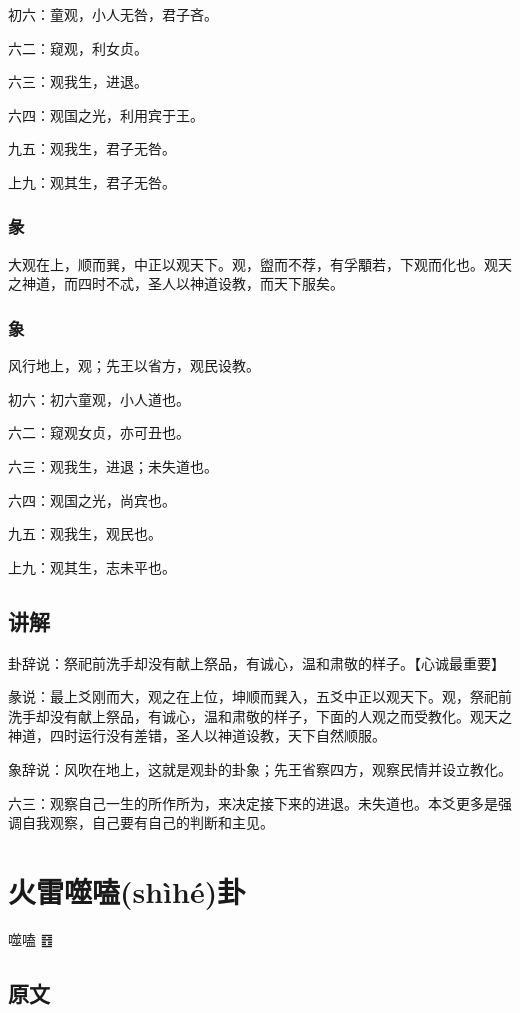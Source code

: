 \documentclass[12pt,oneside]{book}
\begin{document}
初六：童观，小人无咎，君子吝。

六二：窥观，利女贞。

六三：观我生，进退。

六四：观国之光，利用宾于王。

九五：观我生，君子无咎。

上九：观其生，君子无咎。

\subsection{彖}
大观在上，顺而巽，中正以观天下。观，盥而不荐，有孚顒若，下观而化也。观天之神道，而四时不忒，圣人以神道设教，而天下服矣。

\subsection{象}
风行地上，观；先王以省方，观民设教。

初六：初六童观，小人道也。

六二：窥观女贞，亦可丑也。

六三：观我生，进退；未失道也。

六四：观国之光，尚宾也。

九五：观我生，观民也。

上九：观其生，志未平也。

\section{讲解}
卦辞说：祭祀前洗手却没有献上祭品，有诚心，温和肃敬的样子。【心诚最重要】

彖说：最上爻刚而大，观之在上位，坤顺而巽入，五爻中正以观天下。观，祭祀前洗手却没有献上祭品，有诚心，温和肃敬的样子，下面的人观之而受教化。观天之神道，四时运行没有差错，圣人以神道设教，天下自然顺服。

象辞说：风吹在地上，这就是观卦的卦象；先王省察四方，观察民情并设立教化。

六三：观察自己一生的所作所为，来决定接下来的进退。未失道也。本爻更多是强调自我观察，自己要有自己的判断和主见。

\chapter{火雷噬嗑(shìhé)卦}
噬嗑 {\Large ䷔}

\section{原文}
\end{document}
